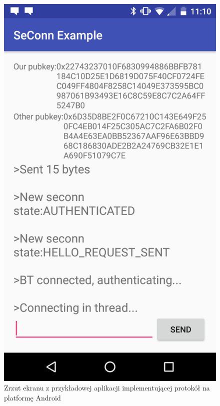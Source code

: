 \begin{figure}
\centering
\includegraphics[height=0.6\textheight]{images/android.png}
\caption{Zrzut ekranu z przykładowej aplikacji implementującej protokół na platformę Android}
\label{fig:android}
\end{figure}
